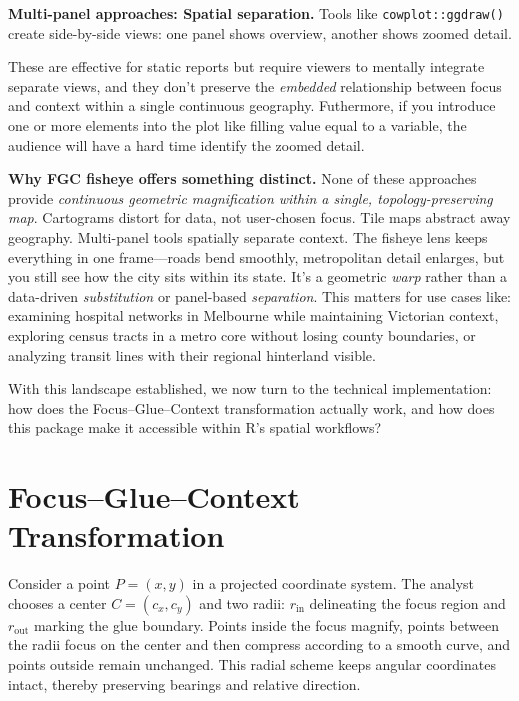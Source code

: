 \textbf{Multi-panel approaches: Spatial separation.} Tools like \texttt{cowplot::ggdraw()}\citep{cowplot} create side-by-side views: one panel shows overview, another shows zoomed detail.


These are effective for static reports but require viewers to mentally integrate separate views, and they don't preserve the \emph{embedded} relationship between focus and context within a single continuous geography. Futhermore, if you introduce one or more elements into the plot like filling value equal to a variable, the audience will have a hard time identify the zoomed detail.

\textbf{Why FGC fisheye offers something distinct.} None of these approaches provide \emph{continuous geometric magnification within a single, topology-preserving map}. Cartograms distort for data, not user-chosen focus. Tile maps abstract away geography. Multi-panel tools spatially separate context. The fisheye lens keeps everything in one frame---roads bend smoothly, metropolitan detail enlarges, but you still see how the city sits within its state. It's a geometric \emph{warp} rather than a data-driven \emph{substitution} or panel-based \emph{separation}. This matters for use cases like: examining hospital networks in Melbourne while maintaining Victorian context, exploring census tracts in a metro core without losing county boundaries, or analyzing transit lines with their regional hinterland visible.

With this landscape established, we now turn to the technical implementation: how does the Focus--Glue--Context transformation actually work, and how does this package make it accessible within R's spatial workflows?

\section{Focus--Glue--Context Transformation}\label{focusgluecontext-transformation}


Consider a point \(P = (x, y)\) in a projected coordinate system. The analyst chooses a center \(C =
(c_x, c_y)\) and two radii: \(r_{\text{in}}\) delineating the focus region and \(r_{\text{out}}\)
marking the glue boundary. Points inside the focus magnify, points between the radii focus on the center and then compress according to a smooth curve, and points outside remain unchanged. This radial scheme keeps angular
coordinates intact, thereby preserving bearings and relative direction.

